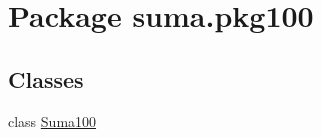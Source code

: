 \hypertarget{namespacesuma_1_1pkg100}{}\section{Package suma.\+pkg100}
\label{namespacesuma_1_1pkg100}
\subsection*{Classes}
\begin{DoxyCompactItemize}
\item 
class \mbox{\hyperlink{classsuma_1_1pkg100_1_1_suma100}{Suma100}}
\end{DoxyCompactItemize}
